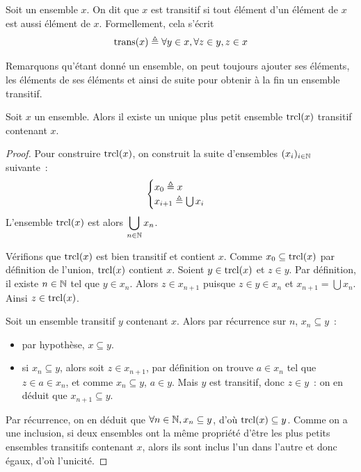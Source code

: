 \begin{definition}
  Soit un ensemble $x$. On dit que $x$ est transitif si tout élément d'un
  élément de $x$ est aussi élément de $x$. Formellement, cela s'écrit
  \[\operatorname{trans}(x) \triangleq \forall y\in x, \forall z \in y, z\in x\]
\end{definition}

Remarquons qu'étant donné un ensemble, on peut toujours ajouter ses éléments,
les éléments de ses éléments et ainsi de suite pour obtenir à la fin un ensemble
transitif.

\begin{proposition}
  Soit $x$ un ensemble. Alors il existe un unique plus petit ensemble $\operatorname{trcl}(x)$
  transitif contenant $x$.
\end{proposition}

\begin{proof}
  Pour construire $\operatorname{trcl}(x)$, on construit la suite d'ensembles
  $(x_i)_{i\in\mathbb N}$ suivante~:
  \[\begin{cases}
  x_0 \triangleq x\\
  x_{i+1} \triangleq \bigcup x_i
  \end{cases}\]
  L'ensemble $\operatorname{trcl}(x)$ est alors $\displaystyle\bigcup_{n\in \mathbb N} x_n$.

  Vérifions que $\operatorname{trcl}(x)$ est bien transitif et contient $x$. Comme
  $x_0\subseteq \operatorname{trcl}(x)$ par définition de l'union, $\operatorname{trcl}(x)$ contient $x$.
  Soient $y\in \operatorname{trcl}(x)$ et $z\in y$. Par définition, il existe $n\in \mathbb N$
  tel que $y\in x_n$. Alors $z\in x_{n+1}$ puisque $z\in y \in x_n$ et
  $x_{n+1}=\bigcup x_n$. Ainsi $z\in \operatorname{trcl}(x)$.

  Soit un ensemble transitif $y$ contenant $x$. Alors par récurrence sur $n$,
  $x_n\subseteq y$~:
  \begin{itemize}
  \item par hypothèse, $x\subseteq y$.
  \item si $x_n\subseteq y$, alors soit $z\in x_{n+1}$, par définition on trouve
    $a\in x_n$ tel que $z\in a \in x_n$, et comme $x_n\subseteq y$, $a\in y$.
    Mais $y$ est transitif, donc $z\in y$~: on en déduit que
    $x_{n+1}\subseteq y$.
  \end{itemize}
  Par récurrence, on en déduit que $\forall n\in\mathbb N, x_n\subseteq y$,
  d'où $\operatorname{trcl}(x)\subseteq y$. Comme on a une inclusion, si deux ensembles ont la
  même propriété d'être les plus petits ensembles transitifs contenant $x$,
  alors ils sont inclus l'un dans l'autre et donc égaux, d'où l'unicité.
\end{proof}

